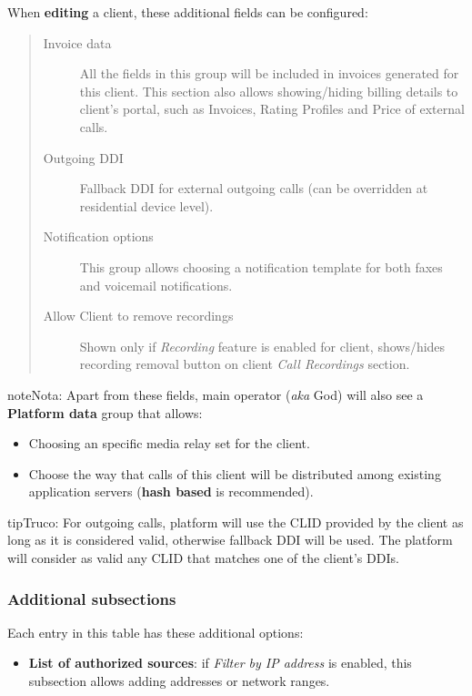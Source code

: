 \documentclass[letterpaper,10pt,spanish]{sphinxmanual}
\begin{document}
When \textbf{editing} a client, these additional fields can be configured:
\begin{quote}
\begin{description}
\item[{Invoice data}] \leavevmode
All the fields in this group will be included in invoices generated for this client. This section also allows
showing/hiding billing details to client's portal, such as Invoices, Rating Profiles and Price of external calls.

\item[{Outgoing DDI}] \leavevmode
Fallback DDI for external outgoing calls (can be overridden at residential device level).

\item[{Notification options}] \leavevmode
This group allows choosing a notification template for both faxes and voicemail notifications.

\item[{Allow Client to remove recordings}] \leavevmode
Shown only if \emph{Recording} feature is enabled for client, shows/hides recording
removal button on client \emph{Call Recordings} section.

\end{description}
\end{quote}

\begin{notice}{note}{Nota:}
Apart from these fields, main operator (\emph{aka} God) will also see a \textbf{Platform data} group that allows:
\begin{itemize}
\item {} 
Choosing an specific media relay set for the client.

\item {} 
Choose the way that calls of this client will be distributed among existing application servers (\textbf{hash based} is recommended).

\end{itemize}
\end{notice}

\begin{notice}{tip}{Truco:}
For outgoing calls, platform will use the CLID provided by the client as long as it is considered valid, otherwise fallback DDI
will be used. The platform will consider as valid any CLID that matches one of the client's DDIs.
\end{notice}


\subsubsection{Additional subsections}
\label{administration_portal/brand/clients/residential:additional-subsections}
Each entry in this table has these additional options:
\begin{itemize}
\item {} 
\textbf{List of authorized sources}: if \emph{Filter by IP address} is enabled, this subsection allows adding addresses or network ranges.

\end{itemize}
\end{document}
